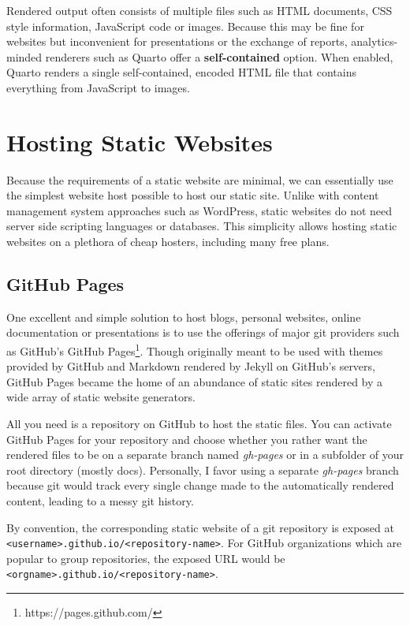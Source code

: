 \documentclass[
  12pt,
  letterpaper,
]{krantz}
\begin{document}
Rendered output often consists of multiple files such as HTML documents,
CSS style information, JavaScript code or images. Because this may be
fine for websites but inconvenient for presentations or the exchange of
reports, analytics-minded renderers such as Quarto offer a
\textbf{self-contained} option. When enabled, Quarto
renders a single self-contained, encoded HTML file that contains
everything from JavaScript to images.

\hypertarget{hosting-static-websites}{%
\section{Hosting Static Websites}\label{hosting-static-websites}}

Because the requirements of a static website are minimal, we can
essentially use the simplest website host possible to host our static
site. Unlike with content management system approaches such as
WordPress, static websites do not need server side scripting languages
or databases. This simplicity allows hosting static
websites on a plethora of cheap hosters, including many free plans.

\hypertarget{github-pages}{%
\subsection{GitHub Pages}\label{github-pages}}

One excellent and simple solution to host blogs, personal websites,
online documentation or presentations is to use the offerings of major
git providers such as GitHub's GitHub Pages\footnote{https://pages.github.com/}.
Though originally meant to be used with themes provided by GitHub and
Markdown rendered by Jekyll on GitHub's servers, GitHub Pages became the
home of an abundance of static sites rendered by a wide array of static
website generators.

All you need is a repository on GitHub to host the static files. You can
activate GitHub Pages for your repository and choose whether you rather
want the rendered files to be on a separate branch named \emph{gh-pages}
or in a subfolder of your root directory (mostly docs). Personally, I
favor using a separate \emph{gh-pages} branch because git would track
every single change made to the automatically rendered content, leading
to a messy git history.

By convention, the corresponding static website of a git repository is
exposed at
\texttt{\textless{}username\textgreater{}.github.io/\textless{}repository-name\textgreater{}}.
For GitHub organizations which are popular to group repositories, the
exposed URL would be
\texttt{\textless{}orgname\textgreater{}.github.io/\textless{}repository-name\textgreater{}}.
\end{document}
